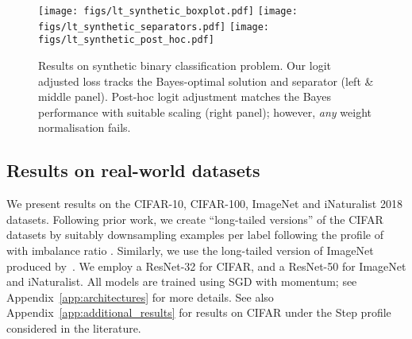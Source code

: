 \begin{figure}[!t]
    \centering
    \resizebox{0.99\linewidth}{!}
    {
\texttt{[image: figs/lt\_synthetic\_boxplot.pdf]}
\quad \texttt{[image: figs/lt\_synthetic\_separators.pdf]}
\quad \texttt{[image: figs/lt\_synthetic\_post\_hoc.pdf]}
}

    \caption{
    Results on synthetic binary classification problem.
Our logit adjusted loss tracks the Bayes-optimal solution
    and separator (left \& middle panel).
    Post-hoc logit adjustment matches the Bayes performance
    with suitable scaling (right panel);
    however, \emph{any} weight normalisation fails.
    }
    \label{fig:lt_synthetic}
    \vspace{-0.5\baselineskip}
\end{figure}



\subsection{Results on real-world datasets}
\label{sec:experiments-real}

We present results on the CIFAR-10, CIFAR-100, ImageNet and iNaturalist 2018 datasets.
Following prior work,
we create ``long-tailed versions'' of the CIFAR datasets by suitably downsampling examples per label 
following the
\expp profile of~\citet{Cui:2019,Cao:2019} with imbalance ratio 
. 
Similarly, we use the long-tailed version of ImageNet produced by~\citet{Liu:2019}.
We employ a ResNet-32 for CIFAR,
and a ResNet-50 for ImageNet and iNaturalist.
All models are trained using SGD with momentum;
see Appendix~\ref{app:architectures} for more details.
See also Appendix~\ref{app:additional_results} for results on CIFAR under the {\sc Step} profile considered in the literature.

